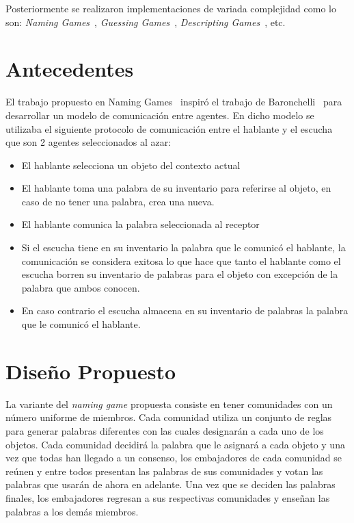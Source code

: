 \documentclass[runningheads]{llncs}
\begin{document}
Posteriormente se realizaron implementaciones de variada complejidad como lo son: \textit{Naming Games}~\cite{ref_article1}, \textit{Guessing Games}~\cite{ref_article1}, \textit{Descripting Games}~\cite{ref_article1}, etc.
\section{Antecedentes}
El trabajo propuesto en Naming Games~\cite{ref_article1} inspiró el trabajo de Baronchelli~\cite{ref_article1} para desarrollar un modelo de comunicación entre agentes. En dicho modelo se utilizaba el siguiente protocolo de comunicación entre el hablante y el escucha que son 2 agentes seleccionados al azar:
\begin{itemize}
	\item El hablante selecciona un objeto del contexto actual
	\item El hablante toma una palabra de su inventario para referirse al objeto, en caso de no tener una palabra, crea una nueva.
	\item El hablante comunica la palabra seleccionada al receptor
	\item Si el escucha tiene en su inventario la palabra que le comunicó el hablante, la comunicación se considera exitosa lo que hace que tanto el hablante como el escucha borren su inventario de palabras para el objeto con excepción de la palabra que ambos conocen.
	\item En caso contrario el escucha almacena en su inventario de palabras la palabra que le comunicó el hablante.
\end{itemize}

\section{Diseño Propuesto}

La variante del \textit{naming game} propuesta consiste en tener comunidades con un número uniforme de miembros. Cada comunidad utiliza un conjunto de reglas para generar palabras diferentes con las cuales designarán a cada uno de los objetos. Cada comunidad decidirá la palabra que le asignará a cada objeto y una vez que todas han llegado a un consenso, los embajadores de cada comunidad se reúnen y entre todos presentan las palabras de sus comunidades y votan las palabras que usarán de ahora en adelante. Una vez que se deciden las palabras finales, los embajadores regresan a sus respectivas comunidades y enseñan las palabras a los demás miembros.
\end{document}
